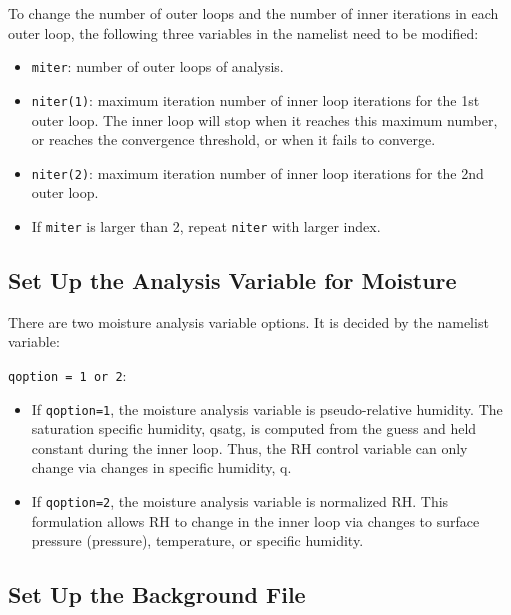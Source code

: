 To change the number of outer loops and the number of inner iterations in each outer loop, the following three variables in the namelist need to be modified: 

\begin{itemize}
\item \verb|miter|: number of outer loops of analysis.
\item \verb|niter(1)|: maximum iteration number of inner loop iterations for the 1st outer loop. The inner loop will stop when it reaches this maximum number, or reaches the convergence threshold, or when it fails to converge.
\item \verb|niter(2)|: maximum iteration number of inner loop iterations for the 2nd outer loop.
\item If \verb|miter| is larger than 2, repeat \verb|niter| with larger index.
\end{itemize}

\subsection{Set Up the Analysis Variable for Moisture}

There are two moisture analysis variable options. It is decided by the namelist variable:

\verb|qoption = 1 or 2|: 
\begin{itemize}
\item If \verb|qoption=1|, the moisture analysis variable is pseudo-relative humidity.   The saturation specific humidity, qsatg, is computed from the guess and held constant during the inner loop.  Thus, the RH control variable can only change via changes in specific humidity, q.
\item If \verb|qoption=2|, the moisture analysis variable is normalized RH. This formulation allows RH to change in the inner loop via changes to surface pressure (pressure), temperature, or specific humidity.
\end{itemize}

\subsection{Set Up the Background File}

